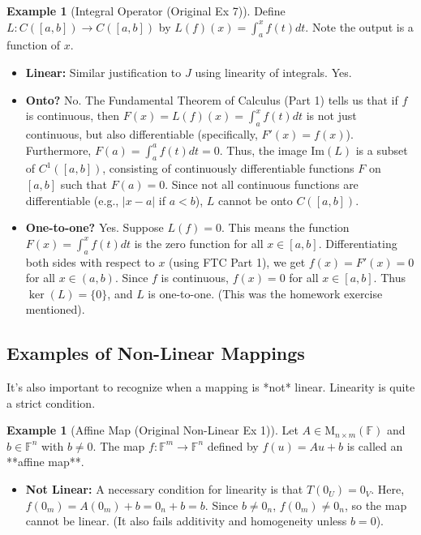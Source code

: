 \documentclass[11pt]{article}
\theoremstyle{definition}
\newtheorem{example}[theorem]{Example}
\theoremstyle{remark}
\newcommand{\F}{\mathbb{F}}
\newcommand{\M}[2]{\mathrm{M}_{#1 \times #2}} %
\newcommand{\Fn}[1]{\F^{#1}}
\newcommand{\img}{\mathrm{Im}} %
\begin{document}
\begin{example}[Integral Operator (Original Ex 7)]
    Define $L: C([a,b]) \to C([a,b])$ by $L(f)(x) = \int_a^x f(t) dt$. Note the output is a function of $x$.
    \begin{itemize}
        \item \textbf{Linear:} Similar justification to $J$ using linearity of integrals. Yes.
        \item \textbf{Onto?} No. The Fundamental Theorem of Calculus (Part 1) tells us that if $f$ is continuous, then $F(x) = L(f)(x) = \int_a^x f(t) dt$ is not just continuous, but also differentiable (specifically, $F'(x) = f(x)$). Furthermore, $F(a) = \int_a^a f(t) dt = 0$. Thus, the image $\img(L)$ is a subset of $C^1([a,b])$, consisting of continuously differentiable functions $F$ on $[a,b]$ such that $F(a)=0$. Since not all continuous functions are differentiable (e.g., $|x-a|$ if $a<b$), $L$ cannot be onto $C([a,b])$.
        \item \textbf{One-to-one?} Yes. Suppose $L(f) = 0$. This means the function $F(x) = \int_a^x f(t) dt$ is the zero function for all $x \in [a,b]$. Differentiating both sides with respect to $x$ (using FTC Part 1), we get $f(x) = F'(x) = 0$ for all $x \in (a,b)$. Since $f$ is continuous, $f(x)=0$ for all $x \in [a,b]$. Thus $\ker(L) = \{0\}$, and $L$ is one-to-one. (This was the homework exercise mentioned).
    \end{itemize}
\end{example}

\subsection{Examples of Non-Linear Mappings}

It's also important to recognize when a mapping is *not* linear. Linearity is quite a strict condition.

\begin{example}[Affine Map (Original Non-Linear Ex 1)]
    Let $A \in \M{n}{m}(\F)$ and $b \in \Fn{n}$ with $b \neq 0$. The map $f: \Fn{m} \to \Fn{n}$ defined by $f(u) = Au + b$ is called an **affine map**.
    \begin{itemize}
        \item \textbf{Not Linear:} A necessary condition for linearity is that $T(0_U) = 0_V$. Here, $f(0_m) = A(0_m) + b = 0_n + b = b$. Since $b \neq 0_n$, $f(0_m) \neq 0_n$, so the map cannot be linear. (It also fails additivity and homogeneity unless $b=0$).
    \end{itemize}
\end{example}
\end{document}
